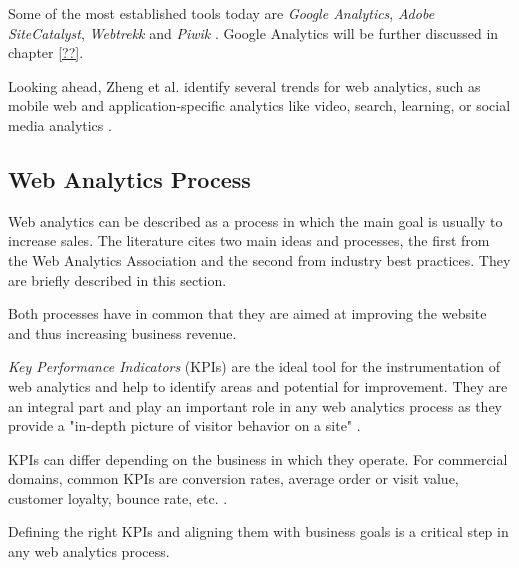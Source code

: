 Some of the most established tools today are \textit{Google Analytics}, \textit{Adobe SiteCatalyst}, \textit{Webtrekk} and \textit{Piwik} \cite{2020Heinemann}. %
Google Analytics will be further discussed in chapter \ref{??}. %

Looking ahead, Zheng et al. identify several trends for web analytics, such as mobile web and application-specific analytics like video, search, learning, or social media analytics \cite{2015Zheng}.








\subsection{Web Analytics Process}
\label{chapter:web_analytics_process}


Web analytics can be described as a process in which the main goal is usually to increase sales.
The literature cites two main ideas and processes, the first from the Web Analytics Association and the second from industry best practices.
They are briefly described in this section.

Both processes have in common that they are aimed at improving the website and thus increasing business revenue.

\textit{Key Performance Indicators} (KPIs) are the ideal tool for the instrumentation of web analytics and help to identify areas and potential for improvement.
They are an integral part and play an important role in any web analytics process as they provide a "in-depth picture of visitor behavior on a site" \cite{2009Jansen}. %

KPIs can differ depending on the business in which they operate.
For commercial domains, common KPIs are conversion rates, average order or visit value, customer loyalty, bounce rate, etc. \cite{2014Singal}.

Defining the right KPIs and aligning them with business goals is a critical step in any web analytics process.





